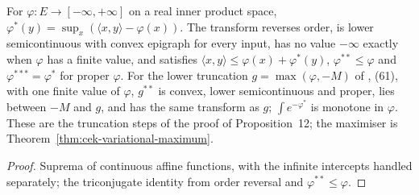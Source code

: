 \begin{lemma}
  \label{lem:legendre-convexification}
  \leanok
  For $\varphi\colon E\to[-\infty,+\infty]$ on a real inner product space, $\varphi^*(y)=\sup_x(\langle x,y\rangle-\varphi(x))$.
  The transform reverses order, is lower semicontinuous with convex epigraph for every input, has no value $-\infty$ exactly
  when $\varphi$ has a finite value, and satisfies $\langle x,y\rangle\le\varphi(x)+\varphi^*(y)$, $\varphi^{**}\le\varphi$
  and $\varphi^{***}=\varphi^*$ for proper $\varphi$.  For the lower truncation $g=\max(\varphi,-M)$ of
  \cite{CorderoKlartag2015}, (61), with one finite value of $\varphi$, $g^{**}$ is convex, lower semicontinuous and proper,
  lies between $-M$ and $g$, and has the same transform as $g$; $\int e^{-\varphi^*}$ is monotone in $\varphi$.  These are the
  truncation steps of the proof of Proposition~12; the maximiser is Theorem~\ref{thm:cek-variational-maximum}.
\end{lemma}
\begin{proof}
  \leanok
  Suprema of continuous affine functions, with the infinite intercepts handled separately; the triconjugate identity from
  order reversal and $\varphi^{**}\le\varphi$.
\end{proof}

